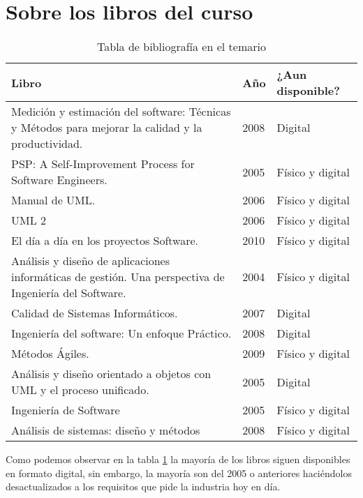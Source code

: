 \documentclass[12pt,twoside]{article}
\begin{document}
\section{Sobre los libros del curso}
\begin{table}[t]
    \begin{center}
    \begin{tabular}{| p{7cm} | p{2cm} | p{4cm} |}
    \hline Libro & Año & ¿Aun disponible? \\ \hline
    Medición y estimación del software: Técnicas y Métodos para mejorar la calidad y la productividad. & 2008 & Digital \\ \hline
    PSP: A Self-Improvement Process for Software
    Engineers. & 2005 & Físico y digital \\ \hline
    Manual de UML. & 2006 & Físico y digital\\ \hline
    UML 2 & 2006 & Físico y digital \\ \hline
    El día a día en los proyectos
    Software.& 2010 & Físico y digital \\ \hline
    Análisis y diseño de aplicaciones
    informáticas de gestión. Una perspectiva de Ingeniería del Software. & 2004 & Físico y digital \\ \hline
    Calidad de Sistemas Informáticos.& 2007 & Digital \\ \hline
    Ingeniería del software: Un enfoque Práctico. & 2008 & Digital \\ \hline
    Métodos Ágiles. & 2009 & Físico y digital \\ \hline
    Análisis y diseño orientado a objetos con UML y el
    proceso unificado. & 2005 & Digital \\ \hline
    Ingeniería de Software & 2005 & Físico y digital \\ \hline
    Análisis de sistemas: diseño y métodos & 2008 & Físico y digital \\ \hline
    \end{tabular}
    \caption{Tabla de bibliografía en el temario}
    \label{tabla: bibliografía}
    \end{center}
    \end{table}
Como podemos observar en la tabla \ref{tabla: bibliografía} la mayoría de los libros siguen disponibles en 
formato digital, sin embargo, la mayoría son del 2005 o anteriores haciéndolos desactualizados a los requisitos
que pide la industria hoy en día.
    
\end{document}
